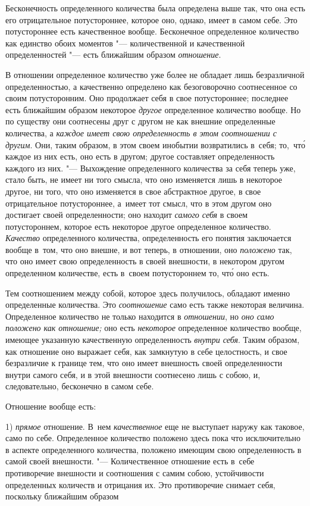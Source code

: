 Бесконечность определенного количества была определена выше так, что она
есть его отрицательное потустороннее, которое оно, однако, имеет в самом
себе. Это потустороннее есть качественное вообще. Бесконечное определенное
количество как единство обоих моментов "--- количественной и качественной
определенностей "--- есть ближайшим образом {\em отношение}.

В отношении определенное количество уже более не обладает лишь безразличной
определенностью, а качественно определено как безоговорочно соотнесенное со
своим потусторонним. Оно продолжает себя в свое потустороннее; последнее есть
ближайшим образом некоторое {\em другое} определенное количество вообще. Но по
существу они соотнесены друг с другом не как внешние определенные количества, а
{\em каждое имеет свою определенность в этом соотношении с другим}. Они, таким
образом, в этом своем инобытии возвратились в~себя; то,~чт\'{о} каждое из них
есть, оно есть в другом; другое составляет определенность каждого из них. "---
Выхождение определенного количества за себя теперь уже, стало быть, не имеет ни
того смысла, что оно изменяется лишь в некоторое другое, ни того, что оно
изменяется в свое абстрактное другое, в свое отрицательное потустороннее,
а~имеет тот смысл, что в этом другом оно достигает своей определенности; оно
находит {\em самого себя} в своем потустороннем, которое есть некоторое другое
определенное количество. {\em Качество} определенного количества,
определенность его понятия заключается вообще в~том, что оно внешне, и вот
теперь, в отношении, оно {\em положено} так, что оно имеет свою определенность
в своей внешности, в некотором другом определенном количестве, есть в~своем
потустороннем то, чт\'{о} оно есть.

Тем соотношением между собой, которое здесь получилось, обладают именно
определенные количества. Это {\em соотношение} само есть также некоторая
величина. Определенное количество не только находится в {\em отношении}, но
{\em оно само положено как отношение;} оно есть {\em некоторое} определенное
количество вообще, имеющее указанную качественную определенность
{\em внутри себя}. Таким образом, как отношение оно выражает себя, как
замкнутую в себе целостность, и свое безразличие к границе тем, что оно имеет
внешность своей определенности внутри самого себя, и в этой внешности
соотнесено лишь с собою, и, следовательно, бесконечно в самом себе.

Отношение вообще есть:

1) {\em прямое} отношение. В~нем {\em качественное} еще не выступает наружу как
таковое, само по себе. Определенное количество положено здесь пока что
исключительно в аспекте определенного количества, положено имеющим свою
определенность в самой своей внешности. "--- Количественное отношение есть
в~себе противоречие внешности и соотношения с самим собою, устойчивости
определенных количеств и отрицания их. Это противоречие снимает себя, поскольку
ближайшим образом

